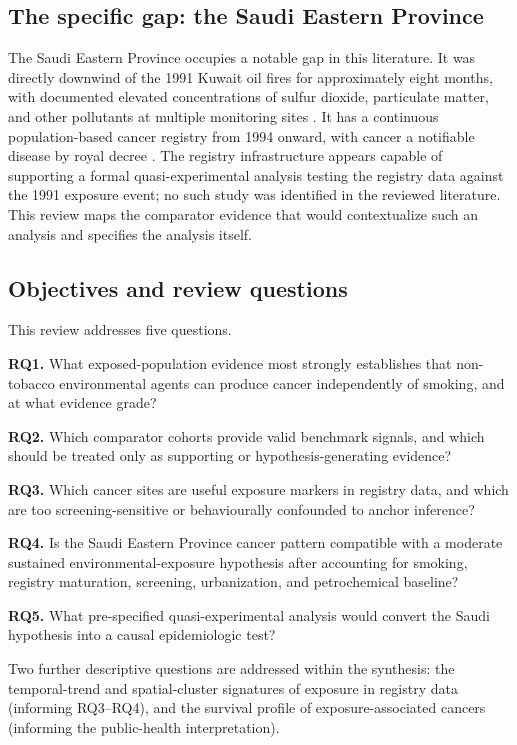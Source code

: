 \documentclass[3p,times]{elsarticle}
\begin{document}
\subsection{The specific gap: the Saudi Eastern Province}
The Saudi Eastern Province occupies a notable gap in this literature. It was directly downwind of the 1991 Kuwait oil fires for approximately eight months, with documented elevated concentrations of sulfur dioxide, particulate matter, and other pollutants at multiple monitoring sites \citep{amin1994}. It has a continuous population-based cancer registry from 1994 onward, with cancer a notifiable disease by royal decree \citep{scr2020}. The registry infrastructure appears capable of supporting a formal quasi-experimental analysis testing the registry data against the 1991 exposure event; no such study was identified in the reviewed literature. This review maps the comparator evidence that would contextualize such an analysis and specifies the analysis itself.

\subsection{Objectives and review questions}
This review addresses five questions.

\textbf{RQ1.} What exposed-population evidence most strongly establishes that non-tobacco environmental agents can produce cancer independently of smoking, and at what evidence grade?

\textbf{RQ2.} Which comparator cohorts provide valid benchmark signals, and which should be treated only as supporting or hypothesis-generating evidence?

\textbf{RQ3.} Which cancer sites are useful exposure markers in registry data, and which are too screening-sensitive or behaviourally confounded to anchor inference?

\textbf{RQ4.} Is the Saudi Eastern Province cancer pattern compatible with a moderate sustained environmental-exposure hypothesis after accounting for smoking, registry maturation, screening, urbanization, and petrochemical baseline?

\textbf{RQ5.} What pre-specified quasi-experimental analysis would convert the Saudi hypothesis into a causal epidemiologic test?

Two further descriptive questions are addressed within the synthesis: the temporal-trend and spatial-cluster signatures of exposure in registry data (informing RQ3--RQ4), and the survival profile of exposure-associated cancers (informing the public-health interpretation).
\end{document}
